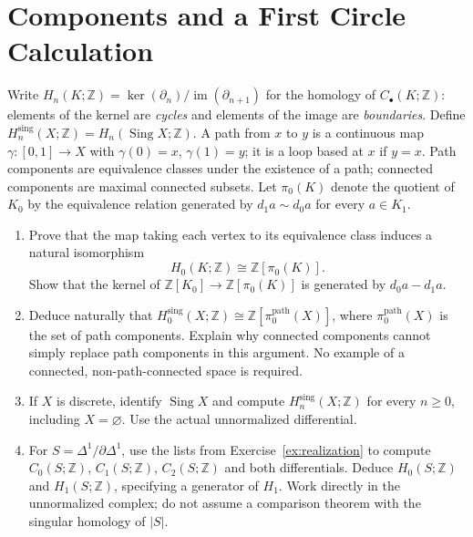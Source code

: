 \documentclass[11pt]{article}
\newcommand{\Z}{\mathbb Z}
\newcommand{\Sing}{\operatorname{Sing}}
\newcommand{\im}{\operatorname{im}}
\begin{document}
\section{Components and a First Circle Calculation}\label{ex:homology}
Write $H_n(K;\Z)=\ker(\partial_n)/\im(\partial_{n+1})$ for the
homology of $C_\bullet(K;\Z)$: elements of the kernel are \emph{cycles}
and elements of the image are \emph{boundaries}.
Define $H_n^{\mathrm{sing}}(X;\Z)=H_n(\Sing X;\Z)$.
A path from $x$ to $y$ is a continuous map $\gamma:[0,1]\to X$
with $\gamma(0)=x$, $\gamma(1)=y$; it is a loop based at $x$ if $y=x$.
Path components are equivalence classes under the existence of a path;
connected components are maximal connected subsets.
Let $\pi_0(K)$ denote the quotient of $K_0$ by the equivalence relation
generated by $d_1a\sim d_0a$ for every $a\in K_1$.
\begin{enumerate}
\item Prove that the map taking each vertex to its equivalence class
induces a natural isomorphism
\[
H_0(K;\Z)\cong\Z[\pi_0(K)].
\]
Show that the kernel of $\Z[K_0]\to\Z[\pi_0(K)]$ is generated by
$ d_0a- d_1a$.
\item Deduce naturally that
$H_0^{\mathrm{sing}}(X;\Z)\cong\Z[\pi_0^{\mathrm{path}}(X)]$,
where $\pi_0^{\mathrm{path}}(X)$ is the set of path components.
Explain why connected components cannot simply replace path components
in this argument. No example of a connected, non-path-connected space
is required.
\item If $X$ is discrete, identify $\Sing X$ and compute
$H_n^{\mathrm{sing}}(X;\Z)$ for every $n\geq0$, including $X=\varnothing$.
Use the actual unnormalized differential.
\item For $S=\Delta^1/\partial\Delta^1$, use the lists from
Exercise~\ref{ex:realization} to compute $C_0(S;\Z)$, $C_1(S;\Z)$,
$C_2(S;\Z)$ and both differentials. Deduce $H_0(S;\Z)$ and
$H_1(S;\Z)$, specifying a generator of $H_1$. Work directly in the
unnormalized complex; do not assume a comparison theorem with the
singular homology of $|S|$.
\end{enumerate}
\end{document}
